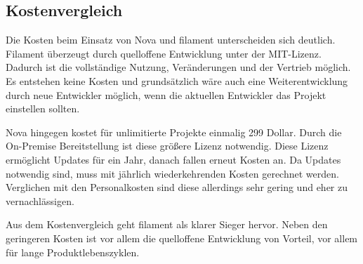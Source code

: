 \newpage

\subsection{Kostenvergleich}
Die Kosten beim Einsatz von Nova und filament unterscheiden sich deutlich.
Filament überzeugt durch quelloffene Entwicklung unter der MIT-Lizenz.
Dadurch ist die vollständige Nutzung, Veränderungen und der Vertrieb möglich.
Es entstehen keine Kosten und grundsätzlich wäre auch eine Weiterentwicklung durch neue Entwickler möglich, wenn die aktuellen Entwickler das Projekt einstellen sollten.

Nova hingegen kostet für unlimitierte Projekte einmalig 299 Dollar.
Durch die On-Premise Bereitstellung ist diese größere Lizenz notwendig.
Diese Lizenz ermöglicht Updates für ein Jahr, danach fallen erneut Kosten an.
Da Updates notwendig sind, muss mit jährlich wiederkehrenden Kosten gerechnet werden.
Verglichen mit den Personalkosten sind diese allerdings sehr gering und eher zu vernachlässigen.

Aus dem Kostenvergleich geht filament als klarer Sieger hervor.
Neben den geringeren Kosten ist vor allem die quelloffene Entwicklung von Vorteil, vor allem für lange Produktlebenszyklen.
